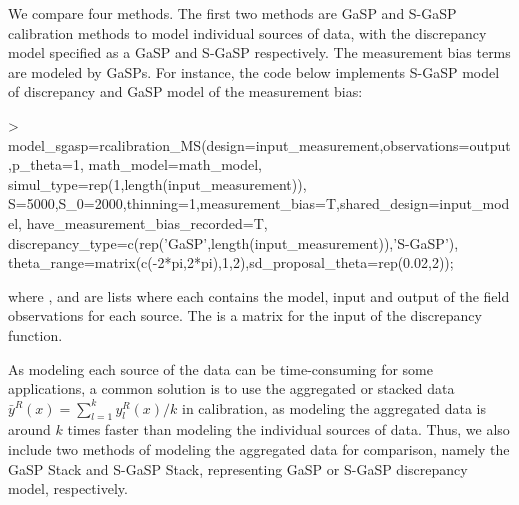 We compare four methods. The first two methods are GaSP and S-GaSP  calibration methods to model individual sources of data, with the discrepancy model specified as a GaSP and S-GaSP respectively. The measurement bias terms are modeled by GaSPs.  {For instance, the code below implements S-GaSP model of discrepancy and GaSP model of the measurement bias:}
\begin{example}
> model_sgasp=rcalibration_MS(design=input_measurement,observations=output,p_theta=1,
              math_model=math_model, simul_type=rep(1,length(input_measurement)),
              S=5000,S_0=2000,thinning=1,measurement_bias=T,shared_design=input_model,
              have_measurement_bias_recorded=T,
              discrepancy_type=c(rep('GaSP',length(input_measurement)),'S-GaSP'),
              theta_range=matrix(c(-2*pi,2*pi),1,2),sd_proposal_theta=rep(0.02,2)); 
\end{example}
{where ,  and  are lists where each contains the model, input and output of the field observations for each source. The  is a matrix for the input of the discrepancy function}. 

 {As modeling each source of the data can be time-consuming for some applications, a common solution is to use the aggregated or stacked data $ \bar y^R(x)=\sum^k_{l=1} y^R_l(x)/k$ in calibration, as modeling the aggregated data is around $k$ times faster than modeling the individual sources of data}. Thus, we also include  two methods of modeling the aggregated data for comparison, namely the GaSP Stack and S-GaSP Stack, representing GaSP or S-GaSP discrepancy model, respectively. 


